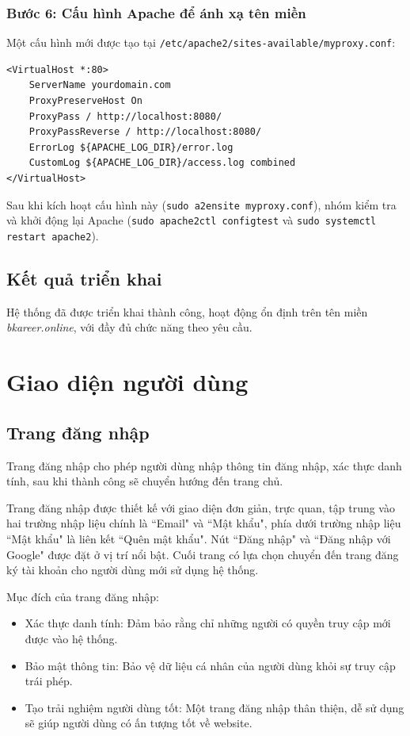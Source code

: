 \subsubsection{Bước 6: Cấu hình Apache để ánh xạ tên miền}
Một cấu hình mới được tạo tại \texttt{/etc/apache2/sites-available/myproxy.conf}:
\begin{verbatim}
<VirtualHost *:80>
    ServerName yourdomain.com
    ProxyPreserveHost On
    ProxyPass / http://localhost:8080/
    ProxyPassReverse / http://localhost:8080/
    ErrorLog ${APACHE_LOG_DIR}/error.log
    CustomLog ${APACHE_LOG_DIR}/access.log combined
</VirtualHost>
\end{verbatim}
Sau khi kích hoạt cấu hình này (\texttt{sudo a2ensite myproxy.conf}), nhóm kiểm tra và khởi động lại Apache (\texttt{sudo apache2ctl configtest} và \texttt{sudo systemctl restart apache2}).

\subsection{Kết quả triển khai}
Hệ thống đã được triển khai thành công, hoạt động ổn định trên tên miền \textit{bkareer.online}, với đầy đủ chức năng theo yêu cầu.


\section{Giao diện người dùng}
\subsection{Trang đăng nhập}
Trang đăng nhập cho phép người dùng nhập thông tin đăng nhập, xác thực danh tính, sau khi thành công sẽ chuyển hướng đến trang chủ.

Trang đăng nhập được thiết kế với giao diện đơn giản, trực quan, tập trung vào hai trường nhập liệu chính là ``Email" và ``Mật khẩu", phía dưới trường nhập liệu ``Mật khẩu" là liên kết ``Quên mật khẩu". Nút ``Đăng nhập" và ``Đăng nhập với Google" được đặt ở vị trí nổi bật. Cuối trang có lựa chọn chuyển đến trang đăng ký tài khoản cho người dùng mới sử dụng hệ thống.

Mục đích của trang đăng nhập:
\begin{itemize}
    \item Xác thực danh tính: Đảm bảo rằng chỉ những người có quyền truy cập mới được vào hệ thống.
    \item Bảo mật thông tin: Bảo vệ dữ liệu cá nhân của người dùng khỏi sự truy cập trái phép.
    \item Tạo trải nghiệm người dùng tốt: Một trang đăng nhập thân thiện, dễ sử dụng sẽ giúp người dùng có ấn tượng tốt về website.
\end{itemize}

